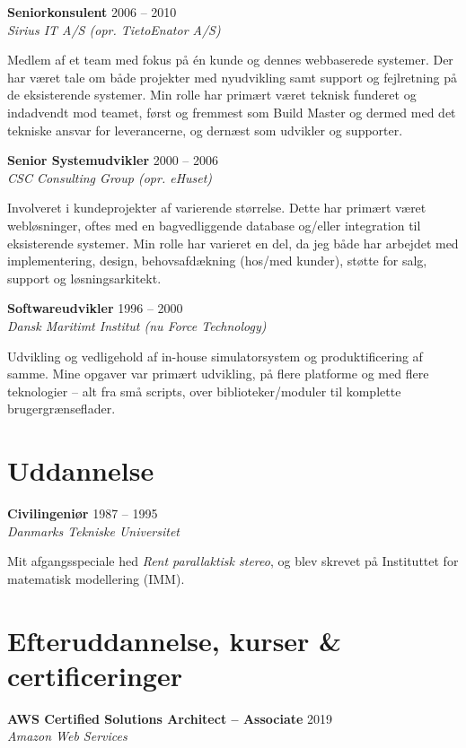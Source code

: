 \documentclass[a4paper,11pt]{article}
\begin{document}
\smallskip

\textbf{Seniorkonsulent} \hfill 2006 -- 2010 \\
\textsl{Sirius IT A/S (opr. TietoEnator A/S)}

Medlem af et team med fokus på én kunde og dennes webbaserede
systemer. Der har været tale om både projekter med nyudvikling samt
support og fejlretning på de eksisterende systemer. Min rolle har
primært været teknisk funderet og indadvendt mod teamet, først og
fremmest som Build Master og dermed med det tekniske ansvar for
leverancerne, og dernæst som udvikler og supporter.

\smallskip

\textbf{Senior Systemudvikler} \hfill 2000 -- 2006 \\
\textsl{CSC Consulting Group (opr. eHuset)}

Involveret i kundeprojekter af varierende størrelse. Dette har primært
været webløsninger, oftes med en bagvedliggende database og/eller
integration til eksisterende systemer. Min rolle har varieret en del,
da jeg både har arbejdet med implementering, design, behovsafdækning
(hos/med kunder), støtte for salg, support og løsningsarkitekt.

\smallskip

\textbf{Softwareudvikler} \hfill 1996 -- 2000 \\
\textsl{Dansk Maritimt Institut (nu Force Technology)}

Udvikling og vedligehold af in-house simulatorsystem og
produktificering af samme. Mine opgaver var primært udvikling, på
flere platforme og med flere teknologier – alt fra små scripts, over
biblioteker/moduler til komplette brugergrænseflader.


\section*{Uddannelse}

\textbf{Civilingeniør} \hfill 1987 -- 1995 \\
\textsl{Danmarks Tekniske Universitet}

Mit afgangsspeciale hed \textit{Rent parallaktisk stereo}, og blev
skrevet på Instituttet for matematisk modellering (IMM).


\section*{Efteruddannelse, kurser \& certificeringer}

\textbf{AWS Certified Solutions Architect -- Associate} \hfill 2019 \\
\textsl{Amazon Web Services}
\end{document}
